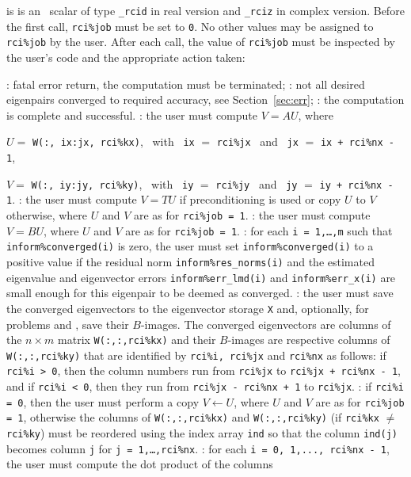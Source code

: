 \begin{description}
%
 is is an \intentinout\ scalar  of type
{\tt \solver\_rcid} in real version and
{\tt \solver\_rciz} in complex version.
Before the first call, {\tt rci\%job} must be set to {\tt 0}.
No other values may be assigned to {\tt rci\%job} by the user.
After each call,
the value of {\tt rci\%job} must be inspected by the user's code
and the appropriate action taken: 
%
\begin{description}
%
: fatal error return, the computation must be terminated;
%
: 
not all desired eigenpairs converged to required accuracy,
see Section~\ref{sec:err}; %
%
: the computation is complete and successful.
%
: the user must compute $V = A U$, where

\hspace{8mm}
$U=$ {\tt W(:, ix:jx, rci\%kx)}, 
~with~ {\tt ix} $=$ {\tt rci\%jx} 
~and~
{\tt jx} $=$ {\tt ix + rci\%nx - 1},

\hspace{8mm}
$V=$ {\tt W(:, iy:jy, rci\%ky)},
~with~ {\tt iy} $=$ {\tt rci\%jy} 
~and~
{\tt jy} $=$ {\tt iy + rci\%nx - 1}.
%
: the user must
compute $V = T U$ if preconditioning is used
or copy $U$ to $V$ otherwise,
where $U$ and $V$ are as for {\tt rci\%job = 1}.
%
:
the user must compute $V = B U$,
where $U$ and $V$ are as for {\tt rci\%job = 1}.
%
:
for each {\tt i = 1,\ldots,m}
such that {\tt inform\%converged(i)} is zero,
the user must set {\tt inform\%converged(i)}
to a positive value if the residual norm
{\tt inform\%res\_norms(i)} and
the estimated eigenvalue and eigenvector errors
{\tt inform\%err\_lmd(i)} and
{\tt inform\%err\_x(i)} are small enough
for this eigenpair to be deemed as converged.
%
: the user must save the converged eigenvectors
to the eigenvector storage {\tt X}
and, optionally, 
for problems  and ,
save their $B$-images.
The converged eigenvectors are columns of the $n\times m$ matrix
{\tt W(:,:,rci\%kx)} and their $B$-images are respective columns of
{\tt W(:,:,rci\%ky)}
that are identified by
{\tt rci\%i, rci\%jx} and {\tt rci\%nx}
as follows:
if {\tt rci\%i > 0}, then the column numbers
run from {\tt rci\%jx} to {\tt rci\%jx + rci\%nx - 1},
and if {\tt rci\%i < 0}, then they run
from {\tt rci\%jx - rci\%nx + 1} to {\tt rci\%jx}.
%
:
if {\tt rci\%i = 0}, then
the user  must perform a copy $V \leftarrow U$, 
where $U$ and $V$ are as for {\tt rci\%job = 1},
otherwise the columns of {\tt W(:,:,rci\%kx)}
and {\tt W(:,:,rci\%ky)}
(if {\tt rci\%kx} $\not=$ {\tt rci\%ky}) 
must be reordered using
the index array {\tt ind} so that %
the column {\tt ind(j)} becomes column {\tt j}
for {\tt j = 1,\ldots,rci\%nx}.
%
:
for each
{\tt i = 0, 1,..., rci\%nx - 1}, 
the user must compute the dot product of
the columns 


\end{description}
\end{description}
